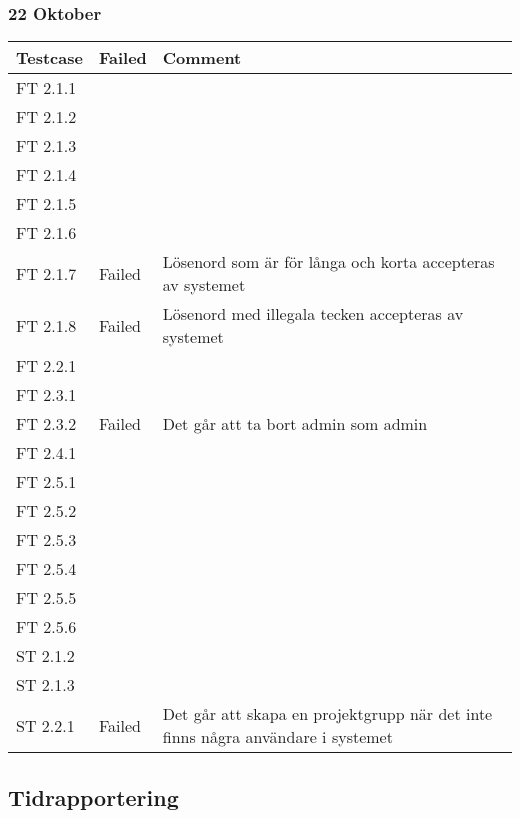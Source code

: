 \documentclass[a4paper]{article}
\begin{document}
\subsubsection{22 Oktober}
\begin{tabular}{| l | l | p{9cm} |}
\hline
Testcase &  Failed & Comment\\
\hline
FT 2.1.1 & & \\
\hline
FT 2.1.2 & & \\
\hline
FT 2.1.3 & & \\
\hline
FT 2.1.4 & & \\
\hline
FT 2.1.5 & & \\
\hline
FT 2.1.6 & & \\
\hline
FT 2.1.7 & Failed & Lösenord som är för långa och korta accepteras av systemet \\
\hline
FT 2.1.8 & Failed & Lösenord med illegala tecken accepteras av systemet \\
\hline
FT 2.2.1 & & \\
\hline
FT 2.3.1 & & \\
\hline
FT 2.3.2 & Failed & Det går att ta bort admin som admin\\
\hline
FT 2.4.1 & & \\
\hline
FT 2.5.1 & & \\
\hline
FT 2.5.2 & & \\
\hline
FT 2.5.3 & & \\
\hline
FT 2.5.4 & & \\
\hline
FT 2.5.5 & & \\
\hline
FT 2.5.6 & & \\
\hline
ST 2.1.2 & & \\
\hline
ST 2.1.3 & & \\
\hline
ST 2.2.1 & Failed & Det går att skapa en projektgrupp när det inte finns några användare i systemet\\
\hline
\end{tabular}








\subsection{Tidrapportering}
\end{document}
